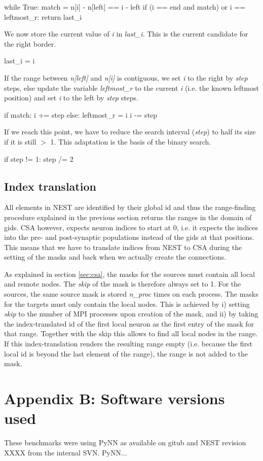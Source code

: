 \documentclass{frontiersSCNS} %
\begin{document}
\begin{pythoncode}
    while True:
        match = n[i] - n[left] == i - left
        if (i == end and match) or i == leftmost_r:
            return last_i
\end{pythoncode}

We now store the current value of \emph{i} in \emph{last\_i}. This is
the current candidate for the right border.

\begin{pythoncode}
        last_i = i 
\end{pythoncode}

If the range between \emph{n[left]} and \emph{n[i]} is contiguous, we
set \emph{i} to the right by \emph{step} steps, else update the
variable \emph{leftmost\_r} to the current \emph{i} (i.e. the known
leftmost position) and set \emph{i} to the left by \emph{step} steps.

\begin{pythoncode}
        if match:
            i += step
        else:
            leftmost_r = i
            i -= step
\end{pythoncode}

If we reach this point, we have to reduce the search interval
(\emph{step}) to half its size if it is still $>$ 1. This adaptation
is the basis of the binary search.

\begin{pythoncode}
        if step != 1:
            step /= 2
\end{pythoncode}

\subsection*{Index translation}

All elements in NEST are identified by their global id and thus the
range-finding procedure explained in the previous section returns the
ranges in the domain of gids. CSA however, expects neuron indices to
start at 0, i.e. it expects the indices into the pre- and
post-synaptic populations instead of the gids at that positions. This
means that we have to translate indices from NEST to CSA during the
setting of the masks and back when we actually create the connections.

As explained in section \ref{sec:csa}, the masks for the sources must
contain all local and remote nodes. The \emph{skip} of the mask is
therefore always set to 1. For the sources, the same source mask is
stored \emph{n\_proc} times on each process. The masks for the targets
must only contain the local nodes. This is achieved by i) setting
\emph{skip} to the number of MPI processes upon creation of the mask,
and ii) by taking the index-translated id of the first local neuron as
the first entry of the mask for that range. Together with the skip
this allows to find all local nodes in the range. If this
index-translation renders the resulting range empty (i.e. because the
first local id is beyond the last element of the range), the range is
not added to the mask.

\section*{Appendix B: Software versions used}

These benchmarks were using PyNN as available on gitub and NEST
revision XXXX from the internal SVN. PyNN...




\end{document}
